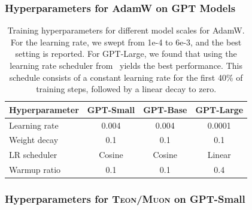 \documentclass{article}
\theoremstyle{plain}
\theoremstyle{definition}
\theoremstyle{remark}
\begin{document}
\subsubsection{Hyperparameters for AdamW on GPT Models}

\begin{table}[htb]
\centering

\setlength{\tabcolsep}{3.5pt}
\begin{tabular}{lccc}
\toprule
\textbf{Hyperparameter} 
& \textbf{GPT-Small} 
& \textbf{GPT-Base} 
& \textbf{GPT-Large} \\
\midrule
Learning rate  & 0.004 & 0.004 & 0.0001 \\
Weight decay   & 0.1 & 0.1 & 0.1 \\
LR scheduler   & Cosine & Cosine & Linear \\
Warmup ratio   & 0.1 & 0.1 & 0.4 \\
\bottomrule
\end{tabular}
\caption{Training hyperparameters for different model scales for AdamW. For the learning rate, we swept from 1e-4 to 6e-3, and the best setting is reported. For GPT-Large, we found that using the learning rate scheduler from~\cite{amsel2025polar} yields the best performance. This schedule consists of a constant learning rate for the first 40\% of training steps, followed by a linear decay to zero.}
\label{tab:training_hparams_llama_adamw}
\end{table}


\subsubsection{Hyperparameters for \textsc{Teon}/\textsc{Muon} on GPT-Small}
\end{document}
